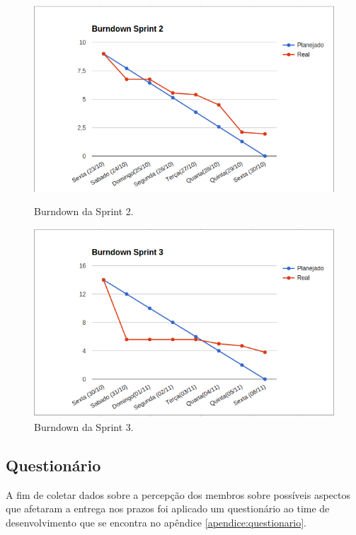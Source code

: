 	\begin{figure}[!h]
	\begin{minipage}[b]{0.5\linewidth} 
	\centering
	\includegraphics[scale=0.5]{figuras/burndown_sprint2.png}
	\caption{Burndown da Sprint 2.}
	\label{fig:burndown2}
	\end{minipage}
	\hspace{0.5cm} 
	\begin{minipage}[b]{0.5\linewidth}
	\centering
	\includegraphics[scale=0.5]{figuras/burndown_sprint3.png}
	\caption{Burndown da Sprint 3.}
	\label{fig:burndown3}
	\end{minipage}
	\end{figure}
	
	\pagebreak


	\subsection{Questionário}

	A fim de coletar dados sobre a percepção dos membros sobre possíveis aspectos que afetaram a entrega nos prazos foi aplicado
	um questionário ao time de desenvolvimento que se encontra no apêndice \ref{apendice:questionario}.



